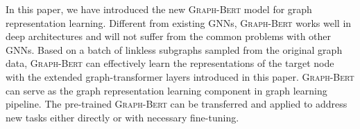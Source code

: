 \documentclass{article}
\newcommand{\our}{\textsc{Graph-Bert}}
\begin{document}
In this paper, we have introduced the new {\our} model for graph representation learning. Different from existing GNNs, {\our} works well in deep architectures and will not suffer from the common problems with other GNNs. Based on a batch of linkless subgraphs sampled from the original graph data, {\our} can effectively learn the representations of the target node with the extended graph-transformer layers introduced in this paper. {\our} can serve as the graph representation learning component in graph learning pipeline. The pre-trained {\our} can be transferred and applied to address new tasks either directly or with necessary fine-tuning.







{


}
\end{document}
